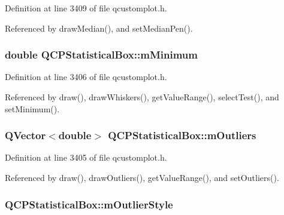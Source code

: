 Definition at line 3409 of file qcustomplot.\+h.



Referenced by draw\+Median(), and set\+Median\+Pen().

\hypertarget{class_q_c_p_statistical_box_a7143ece4e7e5f9ac010739fbc390bf0c}{}
\subsubsection[{m\+Minimum}]{\setlength{\rightskip}{0pt plus 5cm}double Q\+C\+P\+Statistical\+Box\+::m\+Minimum\hspace{0.3cm}{\ttfamily [protected]}}\label{class_q_c_p_statistical_box_a7143ece4e7e5f9ac010739fbc390bf0c}


Definition at line 3406 of file qcustomplot.\+h.



Referenced by draw(), draw\+Whiskers(), get\+Value\+Range(), select\+Test(), and set\+Minimum().

\hypertarget{class_q_c_p_statistical_box_a415e2f77a89396c2af999afe027bdf6c}{}
\subsubsection[{m\+Outliers}]{\setlength{\rightskip}{0pt plus 5cm}Q\+Vector$<$double$>$ Q\+C\+P\+Statistical\+Box\+::m\+Outliers\hspace{0.3cm}{\ttfamily [protected]}}\label{class_q_c_p_statistical_box_a415e2f77a89396c2af999afe027bdf6c}


Definition at line 3405 of file qcustomplot.\+h.



Referenced by draw(), draw\+Outliers(), get\+Value\+Range(), and set\+Outliers().

\hypertarget{class_q_c_p_statistical_box_ae102e4187e1e6ba1f2df0f622b5171a4}{}
\subsubsection[{m\+Outlier\+Style}]{ Q\+C\+P\+Statistical\+Box\+::m\+Outlier\+Style\hspace{0.3cm}{\ttfamily [protected]}}\label{class_q_c_p_statistical_box_ae102e4187e1e6ba1f2df0f622b5171a4}


